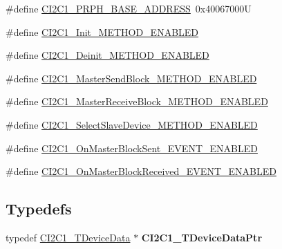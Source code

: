 \begin{DoxyCompactItemize}
\item 
\#define \hyperlink{group___c_i2_c1__module_gac6c037a114fcc2c8b812d3e42612565a}{C\-I2\-C1\-\_\-\-P\-R\-P\-H\-\_\-\-B\-A\-S\-E\-\_\-\-A\-D\-D\-R\-E\-S\-S}~0x40067000\-U
\item 
\#define \hyperlink{group___c_i2_c1__module_ga83a864c8d29bf009b0b6189b85ba2fa0}{C\-I2\-C1\-\_\-\-Init\-\_\-\-M\-E\-T\-H\-O\-D\-\_\-\-E\-N\-A\-B\-L\-E\-D}
\item 
\#define \hyperlink{group___c_i2_c1__module_ga2fe8185cc1ea3a7c6fdf50bbfad3c63e}{C\-I2\-C1\-\_\-\-Deinit\-\_\-\-M\-E\-T\-H\-O\-D\-\_\-\-E\-N\-A\-B\-L\-E\-D}
\item 
\#define \hyperlink{group___c_i2_c1__module_gab08ca0aa4c713f4a6dbc8b43b62ce5ff}{C\-I2\-C1\-\_\-\-Master\-Send\-Block\-\_\-\-M\-E\-T\-H\-O\-D\-\_\-\-E\-N\-A\-B\-L\-E\-D}
\item 
\#define \hyperlink{group___c_i2_c1__module_ga28260740b9fb573de8b99ed0f511f7d3}{C\-I2\-C1\-\_\-\-Master\-Receive\-Block\-\_\-\-M\-E\-T\-H\-O\-D\-\_\-\-E\-N\-A\-B\-L\-E\-D}
\item 
\#define \hyperlink{group___c_i2_c1__module_ga532ac47ee57c1cb958b474501f8c547d}{C\-I2\-C1\-\_\-\-Select\-Slave\-Device\-\_\-\-M\-E\-T\-H\-O\-D\-\_\-\-E\-N\-A\-B\-L\-E\-D}
\item 
\#define \hyperlink{group___c_i2_c1__module_gaec18f6acc3f5b2700a6df434d20ce4c8}{C\-I2\-C1\-\_\-\-On\-Master\-Block\-Sent\-\_\-\-E\-V\-E\-N\-T\-\_\-\-E\-N\-A\-B\-L\-E\-D}
\item 
\#define \hyperlink{group___c_i2_c1__module_gac3def3fafffcb8531bceb42dfaad59e0}{C\-I2\-C1\-\_\-\-On\-Master\-Block\-Received\-\_\-\-E\-V\-E\-N\-T\-\_\-\-E\-N\-A\-B\-L\-E\-D}
\end{DoxyCompactItemize}
\subsection*{Typedefs}
\begin{DoxyCompactItemize}
\item 
\hypertarget{group___c_i2_c1__module_ga0092a4bf605362d2e0dd51f0a857e400}{typedef \hyperlink{struct_c_i2_c1___t_device_data}{C\-I2\-C1\-\_\-\-T\-Device\-Data} $\ast$ {\bfseries C\-I2\-C1\-\_\-\-T\-Device\-Data\-Ptr}}\label{group___c_i2_c1__module_ga0092a4bf605362d2e0dd51f0a857e400}

\end{DoxyCompactItemize}
